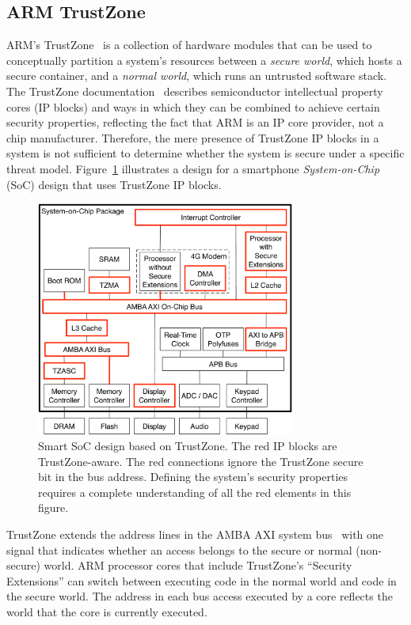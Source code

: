 \subsection{ARM TrustZone}

ARM's TrustZone~\cite{alves2004trustzone} is a collection of hardware modules
that can be used to conceptually partition a system's resources between a
\textit{secure world}, which hosts a secure container, and a \textit{normal
world}, which runs an untrusted software stack. The TrustZone
documentation~\cite{arm2009trustzone} describes semiconductor intellectual
property cores (IP blocks) and ways in which they can be combined to achieve
certain security properties, reflecting the fact that ARM is an IP core
provider, not a chip manufacturer. Therefore, the mere presence of TrustZone IP
blocks in a system is not sufficient to determine whether the system is secure
under a specific threat model. Figure~\ref{fig:trustzone} illustrates a design
for a smartphone \textit{System-on-Chip} (SoC) design that uses TrustZone IP
blocks.

\begin{figure}[hbt]
  \centering
  \includegraphics[width=85mm]{figures/trustzone.pdf}
  \caption{
    Smart SoC design based on TrustZone. The red IP blocks are TrustZone-aware.
    The red connections ignore the TrustZone secure bit in the bus address.
    Defining the system's security properties requires a complete understanding
    of all the red elements in this figure.
  }
  \label{fig:trustzone}
\end{figure}

TrustZone extends the address lines in the AMBA AXI system
bus~\cite{arm2004ambaxi} with one signal that indicates whether an access
belongs to the secure or normal (non-secure) world. ARM processor cores that
include TrustZone's ``Security Extensions'' can switch between executing code
in the normal world and code in the secure world. The address in each bus
access executed by a core reflects the world that the core is currently
executed.

